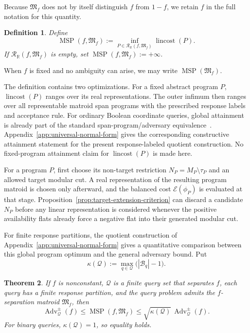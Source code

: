 \documentclass[11pt]{article}
\numberwithin{equation}{section}
\newtheorem{definition}{Definition}[section]
\newtheorem{theorem}[definition]{Theorem}
\theoremstyle{remark}
\begin{document}
Because $\mathfrak M_f$ does not by itself distinguish $f$ from $1-f$, we
retain $f$ in the full notation for this quantity.

\begin{definition}
\label{def:matroid-span-program-cost}
Define
\begin{equation}
    \operatorname{MSP}(f,\mathfrak M_f)
    :=
    \inf_{P\in\mathscr R_{\mathbb R}(f,\mathfrak M_f)}
        \operatorname{lincost}(P).
\end{equation}
If $\mathscr R_{\mathbb R}(f,\mathfrak M_f)$ is empty, set
$\operatorname{MSP}(f,\mathfrak M_f):=+\infty$.
\end{definition}

When $f$ is fixed and no ambiguity can arise, we may write
$\operatorname{MSP}(\mathfrak M_f)$.

The definition contains two optimizations. For a fixed abstract program
$P$, $\operatorname{lincost}(P)$ ranges over its real representations. The
outer infimum then ranges over all representable matroid span programs with
the prescribed response labels and acceptance rule. For ordinary Boolean
coordinate queries, global attainment is already part of the standard
span-program/adversary equivalence~\cite{Reichardt2014Equivalent}.
Appendix~\ref{app:universal-normal-form} gives the corresponding constructive
attainment statement for the present response-labeled quotient construction. No
fixed-program attainment claim for $\operatorname{lincost}(P)$ is made here.

For a program $P$, first choose its non-target restriction
$N_P=M_P\setminus\tau_P$ and an allowed target modular cut. A real
representation of the resulting program matroid is chosen only afterward,
and the balanced cost $\mathcal E(\phi_P)$ is evaluated at that stage.
Proposition~\ref{prop:target-extension-criterion} can discard a candidate
$N_P$ before any linear representation is considered whenever the positive
availability flats already force a negative flat into their generated
modular cut.

For finite response partitions, the quotient construction of
Appendix~\ref{app:universal-normal-form} gives a quantitative comparison
between this global program optimum and the general adversary bound. Put
\begin{equation}
    \kappa(\mathcal Q)
    :=
    \max_{q\in\mathcal Q}
        \bigl(|\mathcal B_q|-1\bigr).
\end{equation}

\begin{theorem}
\label{thm:multiresponse-msp-comparison}
If $f$ is nonconstant, $\mathcal Q$ is a finite query set that separates
$f$, each query has a finite response partition, and the query problem admits
the $f$-separation matroid $\mathfrak M_f$, then
\begin{equation}
    \operatorname{Adv}^{\pm}_{\mathcal Q}(f)
    \leq
    \operatorname{MSP}(f,\mathfrak M_f)
    \leq
    \sqrt{\kappa(\mathcal Q)}\,
    \operatorname{Adv}^{\pm}_{\mathcal Q}(f).
\end{equation}
For binary queries, $\kappa(\mathcal Q)=1$, so equality holds.
\end{theorem}
\end{document}
